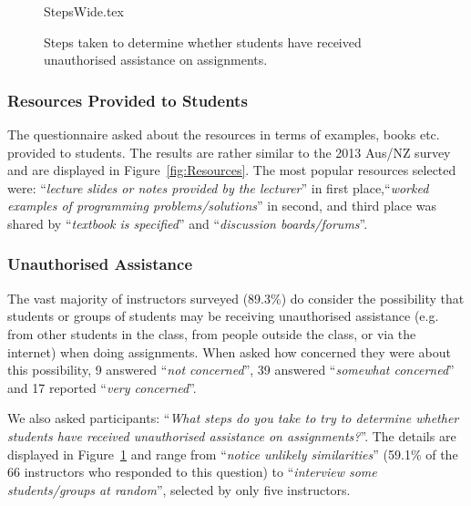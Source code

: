 \documentclass[a4paper,11pt]{article}
\begin{document}
\begin{figure}[th]
\begin{center}
{StepsWide.tex}
\end{center}
\caption{Steps taken to determine whether students have received unauthorised assistance on assignments.\label{fig:Plagiarise}}
\end{figure}

\subsubsection{Resources Provided to Students}

The questionnaire asked about the resources in terms of examples,
books etc. provided to students. The results are rather similar to the
2013 Aus/NZ survey~\cite[Figure 14]{mason+cooper:2014} and are
displayed in Figure~\ref{fig:Resources}. The most popular resources
selected were: ``{\emph{lecture slides or notes provided by the
lecturer}}'' in first place,``{\emph{worked examples of programming
problems/solutions}}'' in second, and third place was shared by
``{\emph{textbook is specified}}'' and ``{\emph{discussion
boards/forums}}''.

\subsubsection{Unauthorised Assistance}

The vast majority of instructors surveyed (89.3\%) do consider the
possibility that students or groups of students may be receiving
unauthorised assistance (e.g. from other students in the class, from
people outside the class, or via the internet) when doing
assignments. When asked how concerned they were about this
possibility, 9 answered ``{\emph{not concerned}}'', 39 answered
``{\emph{somewhat concerned}}'' and 17 reported ``{\emph{very
concerned}}''.

We also asked participants: ``{\emph{What steps do you take to try to
determine whether students have received unauthorised assistance on
assignments?}}''. The details are displayed in
Figure~\ref{fig:Plagiarise} and range from ``{\emph{notice unlikely
similarities}}'' (59.1\% of the 66 instructors who responded to this
question) to ``{\emph{interview some students/groups at random}}'',
selected by only five instructors.


\end{document}
